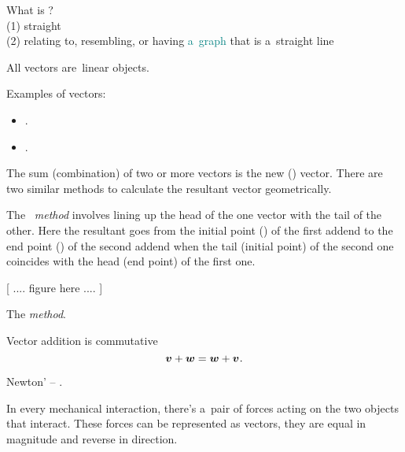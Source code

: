 What is ?
\\
(1) straight
\\
(2) relating to, resembling, or having \textcolor{teal}{a~graph} that is a~straight line

All vectors are linear objects.

Examples of vectors:

\begin{itemize}
\item {}.
%
\item {}    .
\end{itemize}

The sum (combination) of two or more vectors is the new () vector.
There are two similar methods to calculate the resultant vector geometrically.

The \emph{ method} involves lining up the head of the one vector with the tail of the other.
Here the resultant goes from the initial point () of the first addend to the end point () of the second addend when the tail (initial point) of the second one coincides with the head (end point) of the first one.

[ .... figure here .... ]

The \emph{ method}.

Vector addition is commutative
\begin{equation*}
\bm{v} + \bm{w} = \bm{w} + \bm{v}
\hspace{.1ex} .
\end{equation*}



Newton’ -- .

In every mechanical interaction, there’s a~pair of forces acting on the two objects that interact. These forces can be represented as vectors, they are equal in magnitude and reverse in direction.

